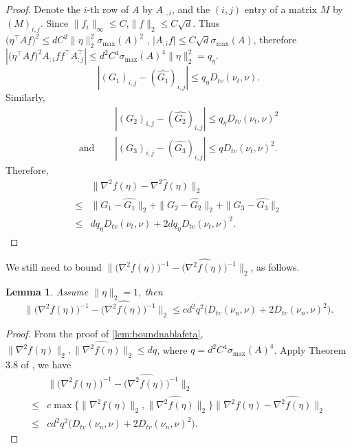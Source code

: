 \documentclass[english]{article} %
\newtheorem{lemma}{Lemma}[section]
\theoremstyle{definition}
\begin{document}
\begin{proof}
Denote the $i$-th row of $A$ by $A_{:,i}$, and the $(i,j)$ entry of a matrix $M$ by $(M)_{i,j}$. Since $\|f_i\|_\infty \le C$,$\|f\|_2 \le C\sqrt{d}$. 
Thus $\big(\eta^{\top}Af\big)^2 \le d C^2\|\eta\|_2^2\sigma_{\max}(A)^2$ 
,  $|A_{:i}f| \le C\sqrt{d}\sigma_{\max}(A)$, 
therefore $|\big(\eta^{\top}Af\big)^2 A_{:i}ff^{\top} A_{:j}^{\top}| \le d^2C^4\sigma_{\max}(A)^4 \|\eta\|_2^2 = q_{\eta}$.
\[
|(G_1)_{i,j} - (\widehat{G_1})_{i,j} | \le q_{\eta} D_{tv}(\nu_t , \nu).
\]
Similarly, 
\begin{align*}
& |(G_2)_{i,j} - (\widehat{G_2})_{i,j} | \le q_{\eta} D_{tv}(\nu_t , \nu)^2 \\
\text{and } \quad & |(G_3)_{i,j} - (\widehat{G_3})_{i,j} | \le q D_{tv}(\nu_t , \nu)^2.
\end{align*}
Therefore,
\begin{align*}
	& \|\nabla^2 f(\eta) - \nabla^2 \widehat{f}(\eta)  \|_2 \\
\le & \|G_1 - \widehat{G_1}\|_2 + \|G_2 - \widehat{G_2}\|_2 + \|G_3 - \widehat{G_3}\|_2 \\
\le & d q_{\eta} D_{tv}(\nu_t , \nu) + 2dq_{\eta} D_{tv}(\nu_t , \nu)^2.
\end{align*}
\end{proof}

We still need to bound $\|\big(\nabla^2 f(\eta)\big)^{-1} - \big(\widehat{\nabla^2 f(\eta)}\big)^{-1}  \|_2 $, as follows.
\begin{lemma}
Assume $\|\eta\|_2 = 1$, then 
\[
\|\big(\nabla^2 f(\eta)\big)^{-1} - \big(\widehat{\nabla^2 f(\eta)}\big)^{-1}  \|_2 \le cd^2q^2\big(D_{tv}(\nu_n , \nu) + 2D_{tv}(\nu_n , \nu)^2\big).
\]
\end{lemma}
\begin{proof}
From the proof of \cref{lem:boundnablafeta}, $\|\nabla^2 f(\eta)\|_2, \|\widehat{\nabla^2 f(\eta)}\|_2 \le dq$, where $q = d^2C^4\sigma_{\max}(A)^4$.
Apply Theorem 3.8 of \citep*{stewart1990matrix}, we have 
\begin{align*}
& \|\big(\nabla^2 f(\eta)\big)^{-1} - \big(\widehat{\nabla^2 f(\eta)}\big)^{-1}  \|_2 \\
\le & c\max\{\|\nabla^2 f(\eta)\|_2, \|\widehat{\nabla^2 f(\eta)}\|_2\} \|\nabla^2 f(\eta) - \widehat{\nabla^2 f(\eta)}\|_2 \\
\le & cd^2q^2\big(D_{tv}(\nu_n , \nu) + 2D_{tv}(\nu_n , \nu)^2\big).
\end{align*}

\end{proof}
\fi
\end{document}
